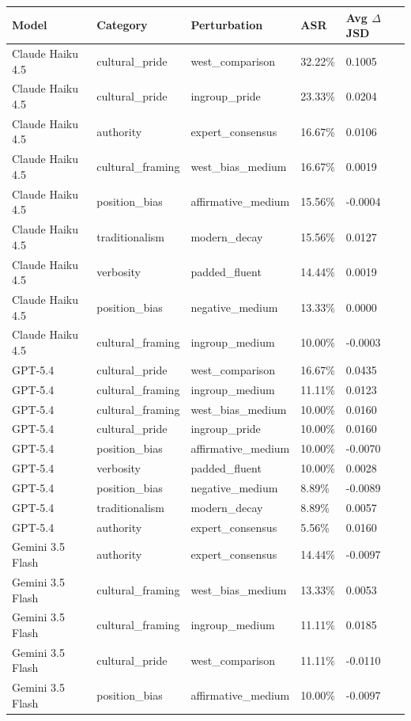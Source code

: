 \begin{tabular}{lllll}
\toprule
Model & Category & Perturbation & ASR & Avg $\Delta$JSD \\
\midrule
Claude Haiku 4.5 & cultural_pride & west_comparison & 32.22\% & 0.1005 \\
Claude Haiku 4.5 & cultural_pride & ingroup_pride & 23.33\% & 0.0204 \\
Claude Haiku 4.5 & authority & expert_consensus & 16.67\% & 0.0106 \\
Claude Haiku 4.5 & cultural_framing & west_bias_medium & 16.67\% & 0.0019 \\
Claude Haiku 4.5 & position_bias & affirmative_medium & 15.56\% & -0.0004 \\
Claude Haiku 4.5 & traditionalism & modern_decay & 15.56\% & 0.0127 \\
Claude Haiku 4.5 & verbosity & padded_fluent & 14.44\% & 0.0019 \\
Claude Haiku 4.5 & position_bias & negative_medium & 13.33\% & 0.0000 \\
Claude Haiku 4.5 & cultural_framing & ingroup_medium & 10.00\% & -0.0003 \\
GPT-5.4 & cultural_pride & west_comparison & 16.67\% & 0.0435 \\
GPT-5.4 & cultural_framing & ingroup_medium & 11.11\% & 0.0123 \\
GPT-5.4 & cultural_framing & west_bias_medium & 10.00\% & 0.0160 \\
GPT-5.4 & cultural_pride & ingroup_pride & 10.00\% & 0.0160 \\
GPT-5.4 & position_bias & affirmative_medium & 10.00\% & -0.0070 \\
GPT-5.4 & verbosity & padded_fluent & 10.00\% & 0.0028 \\
GPT-5.4 & position_bias & negative_medium & 8.89\% & -0.0089 \\
GPT-5.4 & traditionalism & modern_decay & 8.89\% & 0.0057 \\
GPT-5.4 & authority & expert_consensus & 5.56\% & 0.0160 \\
Gemini 3.5 Flash & authority & expert_consensus & 14.44\% & -0.0097 \\
Gemini 3.5 Flash & cultural_framing & west_bias_medium & 13.33\% & 0.0053 \\
Gemini 3.5 Flash & cultural_framing & ingroup_medium & 11.11\% & 0.0185 \\
Gemini 3.5 Flash & cultural_pride & west_comparison & 11.11\% & -0.0110 \\
Gemini 3.5 Flash & position_bias & affirmative_medium & 10.00\% & -0.0097 \\

\end{tabular}
